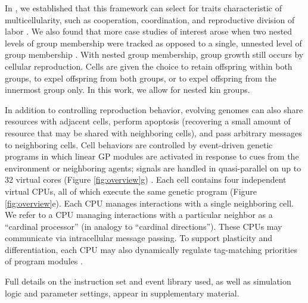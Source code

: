 
In , we established that this framework can select for traits characteristic of multicellularity, such as cooperation, coordination, and reproductive division of labor .
We also found that more case studies of interest arose when two nested levels of group membership were tracked
as opposed to a single, unnested level of group membership .
With nested group membership, group growth still occurs by cellular reproduction.
Cells are given the choice to retain offspring within both groups, to expel offspring from both groups, or to expel offspring from the innermost group only.
In this work, we allow for nested kin groups.

In addition to controlling reproduction behavior, evolving genomes can also share resources with adjacent cells, perform apoptosis (recovering a small amount of resource that may be shared with neighboring cells), and pass arbitrary messages to neighboring cells.
Cell behaviors are controlled by event-driven genetic programs in which linear GP modules are activated in response to cues from the environment or neighboring agents; signals are handled in quasi-parallel on up to 32 virtual cores (Figure \ref{fig:overview}g) \citep{lalejini2018evolving}.
Each cell contains four independent virtual CPUs, all of which execute the same genetic program (Figure \ref{fig:overview}e).
Each CPU manages interactions with a single neighboring cell.
We refer to a CPU managing interactions with a particular neighbor as a ``cardinal processor'' (in analogy to ``cardinal directions'').
These CPUs may communicate via intracellular message passing.
To support plasticity and differentiation, each CPU may also dynamically regulate tag-matching priorities of program modules \citep{lalejini2021tag}.

Full details on the instruction set and event library used, as well as simulation logic and parameter settings, appear in supplementary material.

